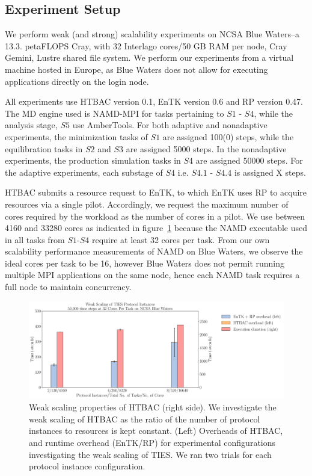 \subsection{Experiment Setup}\label{ssec:exp_design}

We perform weak (and strong) scalability experiments on NCSA Blue Waters--a
13.3. petaFLOPS Cray, with 32 Interlago cores/50 GB RAM per node, Cray Gemini,
Lustre shared file system. We perform our experiments from a virtual machine
hosted in Europe, as Blue Waters does not allow for executing applications
directly on the login node.

All experiments use HTBAC version 0.1, EnTK version 0.6 and RP version 0.47.
The MD engine used is NAMD-MPI for tasks pertaining to $S1$ - $S4$, while the
analysis stage, $S5$ use AmberTools. For both adaptive and nonadaptive
experiments, the minimization tasks of $S1$ are assigned 100(0) steps, while
the equilibration tasks in $S2$ and $S3$ are assigned 5000 steps. In the
nonadaptive experiments, the production simulation tasks in $S4$ are assigned
50000 steps. For the adaptive experiments, each substage of $S4$ i.e. $S4.1$ -
$S4.4$ is assigned X steps.

HTBAC submits a resource request to EnTK, to which EnTK uses RP to acquire
resources via a single pilot. Accordingly, we request the maximum number of
cores required by the workload as the number of cores in a pilot. We use
between 4160 and 33280 cores as indicated in figure~\ref{fig:weak_scaling}
because the NAMD executable used in all tasks from $S1$-$S4$ require at least
32 cores per task. From our own scalability performance measurements of NAMD
on Blue Waters, we observe the ideal cores per task to be 16, however Blue
Waters does not permit running multiple MPI applications on the same node,
hence each NAMD task requires a full node to maintain concurrency.

\begin{figure}
  \centering
   \includegraphics[width=\columnwidth]{./figures/weak_scaling_TIES_instances_50,000_timesteps.pdf}
  \caption{Weak scaling properties of HTBAC (right side). We investigate the
  weak scaling of HTBAC as the ratio of the number of protocol instances to
  resources is kept constant. (Left) Overheads of HTBAC, and runtime overhead (EnTK/RP) for
  experimental configurations investigating the weak scaling of TIES. We ran two trials for each protocol instance configuration.}
\label{fig:weak_scaling}
\end{figure}



